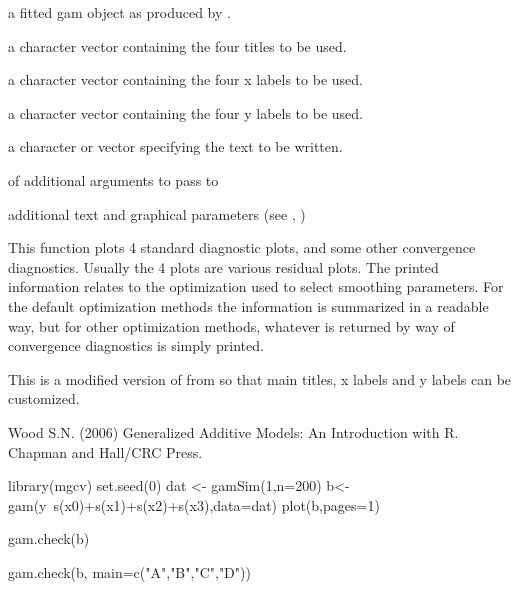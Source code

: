 \documentclass[a4paper]{book}
\begin{document}
\begin{Arguments}
\begin{ldescription}
\item[\code{b}] a fitted gam object as produced by .
\item[\code{main}] a character vector containing the four titles to be used.
\item[\code{xlab}] a character vector containing the four x labels to be used.
\item[\code{ylab}] a character vector containing the four y labels to be used.
\item[\code{text}] a character or  vector specifying the text to be written.
\item[\code{args.histplot}]  of additional arguments to pass to 
\item[\code{...}] additional text and graphical parameters (see , )
\end{ldescription}
\end{Arguments}
%
\begin{Details}\relax
This function plots 4 standard diagnostic plots, and some other convergence
diagnostics. Usually the 4 plots are various residual plots. The printed
information relates to the optimization used to select smoothing parameters.
For the default optimization methods the information is summarized in a readable
way, but for other optimization methods, whatever is returned by way of convergence
diagnostics is simply printed.

This is a modified version of  from  so that
main titles, x labels and y labels can be customized.
\end{Details}
%
\begin{References}\relax
Wood S.N. (2006) Generalized Additive Models: An Introduction with R. Chapman and Hall/CRC Press.
\end{References}
%
\begin{Examples}
\begin{ExampleCode}
library(mgcv)
set.seed(0)
dat <- gamSim(1,n=200)
b<-gam(y~s(x0)+s(x1)+s(x2)+s(x3),data=dat)
plot(b,pages=1)


gam.check(b)                                              

gam.check(b, main=c("A","B","C","D"))                               



\end{ExampleCode}
\end{Examples}
\end{document}
